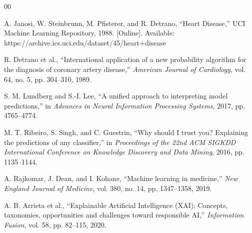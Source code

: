 \documentclass[conference]{IEEEtran}
\begin{document}
\begin{thebibliography}{00}

A. Janosi, W. Steinbrunn, M. Pfisterer, and R. Detrano, ``Heart Disease,'' UCI Machine Learning Repository, 1988. [Online]. Available: https://archive.ics.uci.edu/dataset/45/heart+disease

R. Detrano et al., ``International application of a new probability algorithm for the diagnosis of coronary artery disease,'' \textit{American Journal of Cardiology}, vol. 64, no. 5, pp. 304--310, 1989.

S. M. Lundberg and S.-I. Lee, ``A unified approach to interpreting model predictions,'' in \textit{Advances in Neural Information Processing Systems}, 2017, pp. 4765--4774.

M. T. Ribeiro, S. Singh, and C. Guestrin, ``Why should I trust you? Explaining the predictions of any classifier,'' in \textit{Proceedings of the 22nd ACM SIGKDD International Conference on Knowledge Discovery and Data Mining}, 2016, pp. 1135--1144.

A. Rajkomar, J. Dean, and I. Kohane, ``Machine learning in medicine,'' \textit{New England Journal of Medicine}, vol. 380, no. 14, pp. 1347--1358, 2019.

A. B. Arrieta et al., ``Explainable Artificial Intelligence (XAI): Concepts, taxonomies, opportunities and challenges toward responsible AI,'' \textit{Information Fusion}, vol. 58, pp. 82--115, 2020.

\end{thebibliography}
\end{document}
